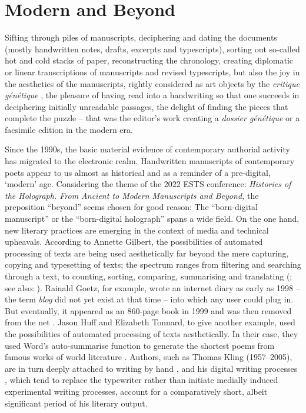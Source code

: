 \documentclass{article}
\begin{document}

\section*{Modern and Beyond} 

Sifting through piles of manuscripts, deciphering and dating the
documents (mostly handwritten notes, drafts, excerpts and typescripts),
sorting out so-called hot and cold stacks of paper, reconstructing the
chronology, creating diplomatic or linear transcriptions of manuscripts
and revised typescripts, but also the joy in the aesthetics of the
manuscripts, rightly considered as art objects by the \emph{critique
génétique} \citep[157]{gresillon_literarische_1999}, the pleasure of having read into a
handwriting so that one succeeds in deciphering initially unreadable
passages, the delight of finding the pieces that complete the puzzle --
that was the editor's work creating a \emph{dossier génétique} or a
facsimile edition in the modern era.

Since the 1990s, the basic material evidence of contemporary authorial
activity has migrated to the electronic realm. Handwritten manuscripts
of contemporary poets appear to us almost as historical and as a
reminder of a pre-digital, `modern' age. Considering the theme of the
2022 ESTS conference: \emph{Histories of the Holograph. From Ancient to
Modern Manuscripts and Beyond,} the preposition ``beyond'' seems chosen
for good reason: The ``born-digital manuscript'' or the ``born-digital
holograph'' spans a wide field. On the one hand, new literary practices
are emerging in the context of media and technical upheavals. According
to Annette Gilbert, the possibilities of automated processing of texts
are being used aesthetically far beyond the mere capturing, copying and
typesetting of texts; the spectrum ranges from filtering and searching
through a text, to counting, sorting, comparing, summarising and
translating (\cite[511]{gilbert_zukunfte_2019}; see also: \cite[34-50]{gilbert_literatures_2022}). Rainald Goetz, for example, wrote an
internet diary as early as 1998 -- the term \emph{blog} did not yet
exist at that time -- into which any user could plug in. But
eventually, it appeared as an 860-page book in 1999 and was then removed
from the net \citep{goetz_abfall_1999}. Jason Huff and Elizabeth Tonnard, to give
another example, used the possibilities of automated processing of texts
aesthetically. In their case, they used Word's auto-summarise function to generate the
shortest poems from famous works of world literature \citep[511]{huff_autosummarize_2010, tonnard_speak_2010, gilbert_zukunfte_2019}. Authors, such as Thomas Kling
(1957--2005), are in turn deeply attached to writing by hand \citep{stussel_thomas_2013,wix_stratigraphic_2016}, and his digital writing processes \citep{ries_rationale_2018},
which tend to replace the typewriter rather than initiate medially
induced experimental writing processes, account for a comparatively
short, albeit significant period of his literary output.
\end{document}
